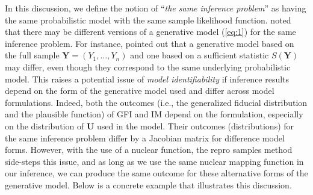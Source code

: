 \documentclass[12pt]{article}
\theoremstyle{shortspace}
\begin{document}
In this discussion, we define the notion of ``{\it the same inference problem}'' as having the same probabilistic model with the same sample likelihood function. \cite{Hannig2009} noted that there may be different versions of a generative model (\ref{eq:1}) for the same inference problem. For instance, \citealp[][Remark~6]{Hannig2009} pointed out that a generative model based on the full sample 
\(\mathbf{Y} = (Y_1, \ldots, Y_n)\) and one based on a sufficient statistic \(S(\mathbf{Y})\) may differ, even though they correspond to the same underlying probabilistic model. This raises a potential issue of \emph{model identifiability} if inference results depend on the form of the generative model used and differ across model formulations. Indeed, both the outcomes (i.e., the generalized fiducial distribution and the plausible function) 
of GFI and IM depend on the formulation, especially on the distribution of \(\mathbf{U}\) used in the model. Their outcomes (distributions) for the same inference problem differ by a Jacobian matrix for difference model forms. However, with the use of a nuclear function, the repro samples method side-steps this issue, and as long as we use the same nuclear mapping function in our inference, we can produce the same outcome for these alternative forms of the generative model. Below is a concrete example that illustrates this discussion. 
\end{document}
